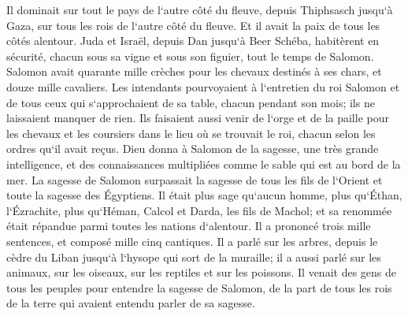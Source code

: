 \verse Il dominait sur tout le pays de l`autre côté du fleuve, depuis Thiphsasch jusqu`à Gaza, sur tous les rois de l`autre côté du fleuve. Et il avait la paix de tous les côtés alentour. 
\verse Juda et Israël, depuis Dan jusqu`à Beer Schéba, habitèrent en sécurité, chacun sous sa vigne et sous son figuier, tout le temps de Salomon. 
\verse Salomon avait quarante mille crèches pour les chevaux destinés à ses chars, et douze mille cavaliers. 
\verse Les intendants pourvoyaient à l`entretien du roi Salomon et de tous ceux qui s`approchaient de sa table, chacun pendant son mois; ils ne laissaient manquer de rien. 
\verse Ils faisaient aussi venir de l`orge et de la paille pour les chevaux et les coursiers dans le lieu où se trouvait le roi, chacun selon les ordres qu`il avait reçus. 
\verse Dieu donna à Salomon de la sagesse, une très grande intelligence, et des connaissances multipliées comme le sable qui est au bord de la mer. 
\verse La sagesse de Salomon surpassait la sagesse de tous les fils de l`Orient et toute la sagesse des Égyptiens. 
\verse Il était plus sage qu`aucun homme, plus qu`Éthan, l`Ézrachite, plus qu`Héman, Calcol et Darda, les fils de Machol; et sa renommée était répandue parmi toutes les nations d`alentour. 
\verse Il a prononcé trois mille sentences, et composé mille cinq cantiques. 
\verse Il a parlé sur les arbres, depuis le cèdre du Liban jusqu`à l`hysope qui sort de la muraille; il a aussi parlé sur les animaux, sur les oiseaux, sur les reptiles et sur les poissons. 
\verse Il venait des gens de tous les peuples pour entendre la sagesse de Salomon, de la part de tous les rois de la terre qui avaient entendu parler de sa sagesse. 

